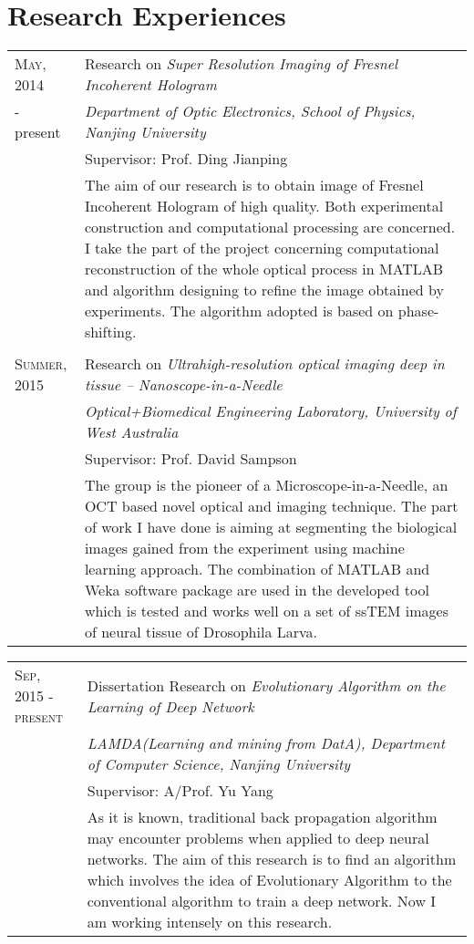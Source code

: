 \documentclass[ENG]{SealZhang}
\begin{document}
\section{Research Experiences}
\begin{tabular}{p{1.8cm}|p{12cm}}

\textsc{May, 2014} & Research on \textit{Super Resolution Imaging of Fresnel Incoherent Hologram} \\
- present&\emph{Department of Optic Electronics, School of Physics, Nanjing University}\\
& Supervisor: Prof. Ding Jianping \\
&\footnotesize{The aim of our research is to obtain image of Fresnel Incoherent Hologram of high quality. Both experimental construction and computational processing are concerned. I take the part of the project concerning computational reconstruction of the whole optical process in MATLAB and algorithm designing to refine the image obtained by experiments. The algorithm adopted is based on phase-shifting.}\\

\multicolumn{2}{c}{} \\

\textsc{Summer, 2015} & Research on \textit{Ultrahigh-resolution optical imaging deep in tissue – Nanoscope-in-a-Needle} \\
&\emph{Optical+Biomedical Engineering Laboratory, University of West Australia}\\
& Supervisor: Prof. David Sampson \\
&\footnotesize{The group is the pioneer of a Microscope-in-a-Needle, an OCT based novel optical and imaging technique. The part of work I have done is aiming at segmenting the biological images gained from the experiment using machine learning approach. The combination of MATLAB and Weka software package are used in the developed tool which is tested and works well on a set of ssTEM images of neural tissue of Drosophila Larva.}\\

\end{tabular}

\begin{tabular}{p{1.8cm}|p{12cm}}

\textsc{Sep, 2015 - present} & Dissertation Research on \textit{Evolutionary Algorithm on the Learning of Deep Network}\\
&\emph{LAMDA(Learning and mining from DatA), Department of Computer Science, Nanjing University}\\
& Supervisor: A/Prof. Yu Yang \\
&\footnotesize{As it is known, traditional back propagation algorithm may encounter problems when applied to deep neural networks. The aim of this research is to find an algorithm which involves the idea of Evolutionary Algorithm to the conventional algorithm to train a deep network. Now I am working intensely on this research.}\\

\end{tabular}
\end{document}
